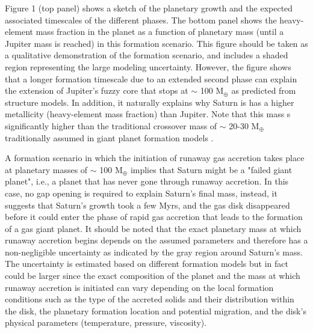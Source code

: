 \documentclass{aa}
\begin{document}
Figure 1 (top panel) shows a sketch of the planetary growth and the expected associated timescales of the different phases.  The bottom panel shows the heavy-element mass fraction in the planet as a function of planetary mass (until a Jupiter mass is reached) in this formation scenario. 
This figure should be taken as a qualitative demonstration of the formation scenario, and includes a shaded region representing the large modeling uncertainty. 
However, {the figure} shows that a longer formation timescale due to an extended second phase can explain the extension of Jupiter's fuzzy core that stops at $\sim$ 100 M$_{\oplus}$ as predicted from structure models. In addition, it  naturally explains why Saturn is has a higher metallicity (heavy-element mass fraction) than Jupiter. 
Note that this mass s significantly higher than the traditional crossover mass of $\sim$ 20-30 M$_{\oplus}$ traditionally assumed in giant planet formation models \citep[e.g.,][and references therein]{Stevenson1982,Bodenheimer1986,Pollack1996,2014ApJ...786...21P,Helled2014}.
\par 


A formation scenario in which the initiation of runaway gas accretion takes place at planetary masses of $\sim$ 100 M$_{\oplus}$ implies that Saturn might be a "failed giant planet", i.e., a planet that has never gone through runaway accretion. In this case, no gap opening is required to explain Saturn's final mass, instead, it suggests that Saturn's growth took a few Myrs, and the gas disk disappeared before it could enter the phase of rapid gas accretion that leads to the formation of a gas giant planet.  
It should be noted that the exact planetary mass at which runaway accretion begins depends on the assumed parameters and therefore has a non-negligible uncertainty as indicated by the gray region around Saturn's mass.  The uncertainty is estimated based on different formation models \citep[e.g.,][]{Venturini2020, Valletta2020} but in fact could be larger since the exact composition of the planet and the mass at which runaway accretion is initiated can vary depending on the local formation conditions such as the type of the accreted solids and their distribution within the disk, the planetary  formation location and potential migration, and the disk's physical parameters (temperature, pressure, viscosity). 
\par 
\end{document}
